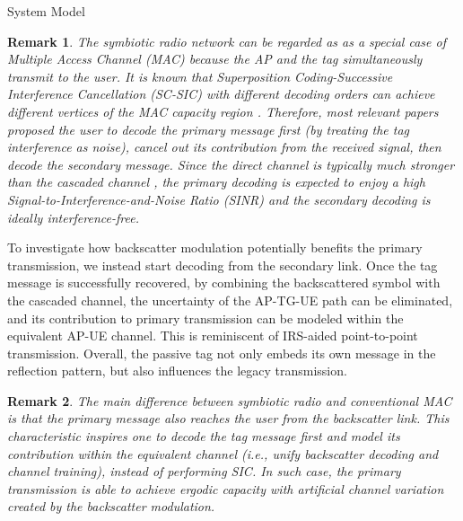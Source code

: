\documentclass[journal]{IEEEtran}
\newtheorem{remark}{Remark}
\begin{document}
\begin{section}{System Model}
		\begin{remark}
			The symbiotic radio network can be regarded as as a special case of Multiple Access Channel (MAC) because the AP and the tag simultaneously transmit to the user. It is known that Superposition Coding-Successive Interference Cancellation (SC-SIC) with different decoding orders can achieve different vertices of the MAC capacity region \cite{Goldsmith2005}. Therefore, most relevant papers proposed the user to decode the primary message first (by treating the tag interference as noise), cancel out its contribution from the received signal, then decode the secondary message. Since the direct channel is typically much stronger than the cascaded channel \cite{Ozdogan2020}, the primary decoding is expected to enjoy a high Signal-to-Interference-and-Noise Ratio (SINR) and the secondary decoding is ideally interference-free.
		\end{remark}

		To investigate how backscatter modulation potentially benefits the primary transmission, we instead start decoding from the secondary link. Once the tag message is successfully recovered, by combining the backscattered symbol with the cascaded channel, the uncertainty of the AP-TG-UE path can be eliminated, and its contribution to primary transmission can be modeled within the equivalent AP-UE channel. This is reminiscent of IRS-aided point-to-point transmission. Overall, the passive tag not only embeds its own message in the reflection pattern, but also influences the legacy transmission.

		\begin{remark}
			The main difference between symbiotic radio and conventional MAC is that the primary message also reaches the user from the backscatter link. This characteristic inspires one to decode the tag message first and model its contribution within the equivalent channel (i.e., unify backscatter decoding and channel training), instead of performing SIC. In such case, the primary transmission is able to achieve ergodic capacity with artificial channel variation created by the backscatter modulation.
		\end{remark}




\end{section}
\end{document}
